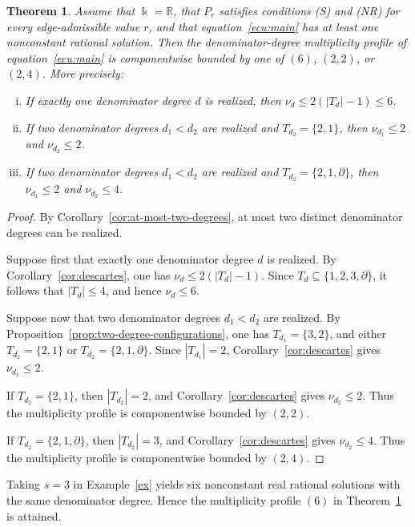 \documentclass[12pt,a4paper]{amsart}
\newtheorem{theorem}{Theorem}
\numberwithin{theorem}{section}
\theoremstyle{definition}
\begin{document}
	\begin{theorem}\label{thm:real-basic-profiles}
		Assume that $\Bbbk=\mathbb{R}$, that $P_r$ satisfies conditions {\rm (S)} and {\rm (NR)} for every edge-admissible value $r$, and that equation~\eqref{ecu:main} has at least one nonconstant rational solution. Then the denominator-degree multiplicity profile of equation~\eqref{ecu:main} is componentwise bounded by one of $(6)$, $(2,2)$, or $(2,4)$. More precisely:
		\begin{enumerate}[(i)]
			\item If exactly one denominator degree $d$ is realized, then $\nu_d\leq2(|T_d|-1)\leq6$.
			\item If two denominator degrees $d_1<d_2$ are realized and $T_{d_2}=\{2,1\}$, then $\nu_{d_1}\leq2$ and $\nu_{d_2}\leq2$.
			\item If two denominator degrees $d_1<d_2$ are realized and $T_{d_2}=\{2,1,\partial\}$, then $\nu_{d_1}\leq2$ and $\nu_{d_2}\leq4$.
		\end{enumerate}
	\end{theorem}
	
	\begin{proof}
		By Corollary~\ref{cor:at-most-two-degrees}, at most two distinct denominator degrees can be realized.
		
		Suppose first that exactly one denominator degree $d$ is realized. By Corollary~\ref{cor:descartes}, one has $\nu_d\leq2(|T_d|-1)$. Since $T_d\subseteq\{1,2,3,\partial\}$, it follows that $|T_d|\leq4$, and hence $\nu_d\leq6$.
		
		Suppose now that two denominator degrees $d_1<d_2$ are realized. By Proposition~\ref{prop:two-degree-configurations}, one has $T_{d_1}=\{3,2\}$, and either $T_{d_2}=\{2,1\}$ or $T_{d_2}=\{2,1,\partial\}$. Since $|T_{d_1}|=2$, Corollary~\ref{cor:descartes} gives $\nu_{d_1}\leq2$.
		
		If $T_{d_2}=\{2,1\}$, then $|T_{d_2}|=2$, and Corollary~\ref{cor:descartes} gives $\nu_{d_2}\leq2$. Thus the multiplicity profile is componentwise bounded by $(2,2)$.
		
		If $T_{d_2}=\{2,1,\partial\}$, then $|T_{d_2}|=3$, and Corollary~\ref{cor:descartes} gives $\nu_{d_2}\leq4$. Thus the multiplicity profile is componentwise bounded by $(2,4)$.
	\end{proof}
	
	Taking $s=3$ in Example~\ref{ex} yields six nonconstant real rational solutions with the same denominator degree. Hence the multiplicity profile $(6)$ in Theorem~\ref{thm:real-basic-profiles} is attained.
	
\end{document}
